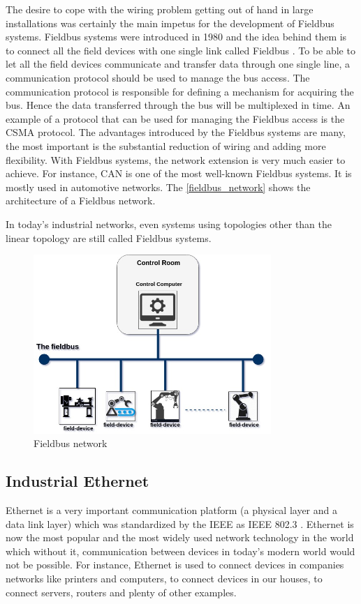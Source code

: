 The desire to cope with the wiring problem getting out of hand in large installations was certainly the main impetus
for the development of Fieldbus systems. Fieldbus systems were introduced in 1980 and the idea behind them is to connect all the field
devices with one single link called Fieldbus \cite{zurawski2014industrial}. To be able to let all the field devices
communicate and transfer data through one single line, a communication protocol should be used to manage the bus
access. The communication protocol is responsible for defining a mechanism for acquiring the bus.
Hence the data transferred through the bus will be multiplexed in time. An example of a protocol that can be used for
managing the Fieldbus access is the \ac{CSMA} protocol. The advantages introduced by the Fieldbus systems are many, the most
important is the substantial reduction of wiring and adding more flexibility. With Fieldbus systems, the network extension
is very much easier to achieve.
For instance, CAN is one of the most well-known Fieldbus systems. It is mostly used in automotive networks.
The \autoref{fieldbus_network} shows the architecture of a Fieldbus network.

In today's industrial networks, even systems using topologies other than the linear topology are still called Fieldbus systems.

\begin{figure}[!htbp]
\centering
\includegraphics[width=9cm]{figures/fieldbus/fieldbus_network.jpg}
\caption{Fieldbus network}\label{fieldbus_network}
\end{figure}

\subsection{Industrial Ethernet}

Ethernet is a very important communication platform (a physical layer and a data link layer)
which was standardized by the \ac{IEEE} as IEEE 802.3 \cite{kunbusIndustrialEthernet}.
Ethernet is now the most popular and the most widely used network technology in the world which without
it, communication between devices in today’s modern world would not be possible. For instance, Ethernet
is used to connect devices in companies networks like printers and computers, to connect devices in
our houses, to connect servers, routers and plenty of other examples.

